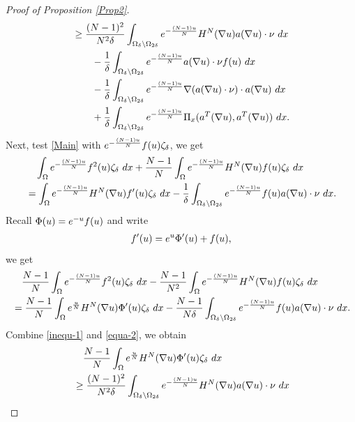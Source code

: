 \documentclass[10pt,a4paper]{amsart}
\numberwithin{equation}{section}
\newcommand{\e}{\textup{e}}
\newcommand{\dx}{\textup{d}x}
\begin{document}
\begin{proof}[Proof of Proposition \ref{Prop2}]
\begin{align}
        & \geq \frac{(N-1)^2}{N^2 \delta} \int_{\Omega_{\delta} \backslash \Omega_{2\delta}} \e^{-\frac{(N-1)u}{N}} H^N(\nabla u) a(\nabla u) \cdot \nu \ dx \label{inequ-1} \\
        & \qquad -\frac{1}{\delta} \int_{\Omega_{\delta} \backslash \Omega_{2\delta}} \e^{-\frac{(N-1)u}{N}}  a(\nabla u) \cdot \nu f(u)  \ \dx \nonumber\\
        & \qquad -\frac{1}{\delta} \int_{\Omega_{\delta} \backslash \Omega_{2\delta}} \e^{-\frac{(N-1)u}{N}} \nabla (a(\nabla u) \cdot \nu) \cdot a(\nabla u) \ \dx \nonumber \\
        & \qquad  + \frac{1}{\delta} \int_{\Omega_{\delta} \backslash \Omega_{2\delta}} \e^{-\frac{(N-1)u}{N}} \Pi_x( a^T(\nabla u),a^T(\nabla u) ) \ \dx. \nonumber
    \end{align}
    Next, test \eqref{Main} with $\e^{-\frac{(N-1)u}{N}} f(u) \zeta_{\delta}$, we get
    \begin{align*}
        & \quad \int_{\Omega} \e^{-\frac{(N-1)u}{N}} f^2(u) \zeta_{\delta} \ \dx +\frac{N-1}{N} \int_{\Omega} e^{-\frac{(N-1)u}{N}} H^{N}(\nabla u) f(u) \zeta_{\delta} \ \dx \\
        & = \int_{\Omega} \e^{-\frac{(N-1)u}{N}} H^N(\nabla u) f'(u) \zeta_{\delta} \ \dx - \frac{1}{\delta}\int_{\Omega_{\delta}\backslash \Omega_{2\delta}}\e^{-\frac{(N-1)u}{N}} f(u) a(\nabla u) \cdot \nu \ \dx.
     \end{align*}
     Recall $\Phi(u) = \e^{-u} f(u) $ and write
     \begin{align*}
         f'(u) = \e^{u} \Phi'(u) + f(u),
     \end{align*}
     we get
     \begin{align}
        & \quad \frac{N-1}{N}\int_{\Omega} \e^{-\frac{(N-1)u}{N}}  f^2(u) \zeta_{\delta} \ \dx  - \frac{N-1}{N^2} \int_{\Omega} e^{-\frac{(N-1)u}{N}} H^{N}(\nabla u) f(u) \zeta_{\delta} \ \dx  \label{equa-2}\\
        & = \frac{N-1}{N}\int_{\Omega} \e^{\frac{u}{N}} H^N(\nabla u) \Phi'(u) \zeta_{\delta} \ \dx - \frac{N-1}{N\delta}\int_{\Omega_{\delta}\backslash \Omega_{2\delta}}\e^{-\frac{(N-1)u}{N}} f(u) a(\nabla u) \cdot \nu \ \dx. \nonumber
    \end{align}
    Combine \eqref{inequ-1} and \eqref{equa-2}, we obtain
    \begin{align}\label{inequa-2}
       &\quad  \frac{N-1}{N}\int_{\Omega} \e^{\frac{u}{N}} H^N(\nabla u) \Phi'(u) \zeta_{\delta} \ \dx \\
        & \geq \frac{(N-1)^2}{N^2 \delta} \int_{\Omega_{\delta} \backslash \Omega_{2\delta}} \e^{-\frac{(N-1)u}{N}} H^N(\nabla u) a(\nabla u) \cdot \nu \ dx \nonumber \\

\end{align}
\end{proof}
\end{document}
